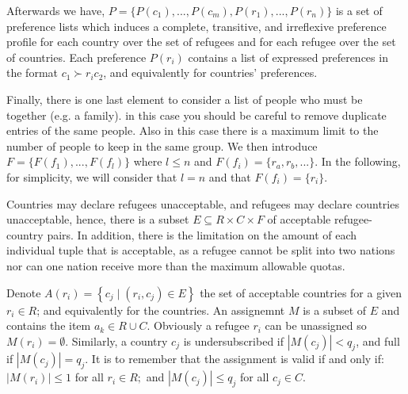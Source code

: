 \documentclass[letterpaper]{article} %
\begin{document}
Afterwards we have, \(P = \{P(c_1), . . . , P(c_m), P(r_1), . . . , P(r_n)\}\) is
a set of preference lists which induces a complete, transitive, and irreflexive preference profile for each
country over the set of refugees and for each refugee over the set of countries. 
Each preference \(P(r_i)\) contains a list of expressed preferences in the format \( c _ { 1 } \succ r _ { i } c _ { 2 } \),
and equivalently for countries' preferences.

Finally, there is one last element to consider a list of people who must be together (e.g. a family).
in this case you should be careful to remove duplicate entries of the same people. Also in this case there is a maximum limit to the number of people to keep in the same group.
We then introduce \(F=\{F(f_1), ..., F(f_l)\}\) where \(l\leq n\) and \(F(f_i) = \{r_a, r_b, ...\}\).
In the following, for simplicity, we will consider that \(l=n\) and that \(F(f_i)=\{r_i\}\).

Countries may declare refugees unacceptable, and refugees may declare countries unacceptable, 
hence, there is a subset \(E \subseteq R \times C \times F\) of acceptable refugee-country pairs.
In addition, there is the limitation on the amount of each individual tuple that is acceptable, as a refugee cannot be split into two nations nor can one nation receive more than the maximum allowable quotas.

Denote \( A \left( r _ { i } \right) = \left\{ c _ { j } \mid \left( r _ { i } , c _ { j } \right) \in E \right\} \)
the set of acceptable countries for a given \( r _ { i } \in R \); and equivalently for the countries.
An assignemnt \(M\) is a subset of \(E\) and contains the item \( a _ { k } \in R \cup C \). Obviously a refugee \( r _ { i } \) can be unassigned so \( M \left( r _ { i } \right) = \emptyset \).
Similarly, a country \( c _ { j } \) is
undersubscribed if \( \left| M \left( c _ { j } \right) \right| < q _ { j } \), and full if \( \left| M \left( c _ { j } \right) \right| = q _ { j } \).
It is to remember that the assignment is valid if and only if:
\( \left| M \left( r _ { i } \right) \right| \leq 1 \) for all \( r _ { i } \in R ; \) and
\( \left| M \left( c _ { j } \right) \right| \leq q _ { j } \) for all \( c _ { j } \in C  \).
\end{document}

